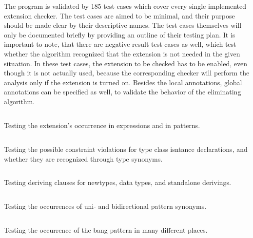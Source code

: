 \documentclass[main.tex]{subfiles}
\begin{document}
	
	The program is validated by 185 test cases which cover every single implemented extension checker. The test cases are aimed to be minimal, and their purpose should be made clear by their descriptive names. The test cases themselves will only be documented briefly by providing an outline of their testing plan. It is important to note, that there are negative result test cases as well, which test whether the algorithm recognized that the extension is not needed in the given situation. In these test cases, the extension to be checked has to be enabled, even though it is not actually used, because the corresponding checker will perform the analysis only if the extension is turned on. Besides the local annotations, global annotations can be specified as well, to validate the behavior of the eliminating algorithm.
	
	\subsection{}
	
	Testing the extension's occurrence in expressions and in patterns.
	
	\subsection{}
	
	Testing the possible constraint violations for type class isntance declarations, and whether they are recognized through type synonyms.
	
	\subsection{}
	
	Testing deriving clauses for newtypes, data types, and standalone derivings.
	
	\subsection{}
	
	Testing the occurrences of uni- and bidirectional pattern synonyms.
	
	\subsection{}
	
	Testing the occurrence of the bang pattern in many different places.
	
\end{document}
